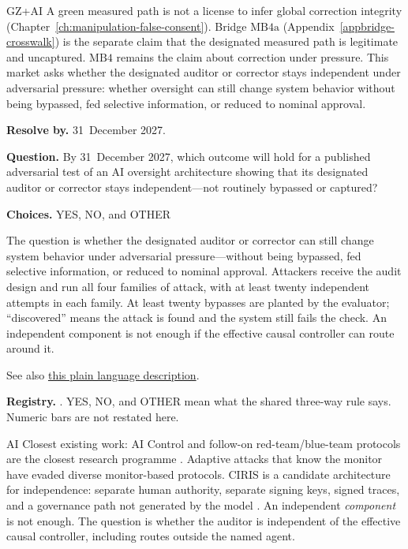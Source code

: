 \begin{authbar}{GZ+AI}
A green measured path is not a license to infer global correction integrity (Chapter~\ref{ch:manipulation-false-consent}).
Bridge \(\text{MB4a}\) (Appendix~\ref{appbridge-crosswalk}) is the separate claim that the designated measured path is legitimate and uncaptured. \(\text{MB4}\) remains the claim about correction under pressure.
This market asks whether the designated auditor or corrector stays independent under adversarial pressure: whether oversight can still change system behavior without being bypassed, fed selective information, or reduced to nominal approval.
\end{authbar}
\begin{predictionbox}
\textbf{Resolve by.} 31~December 2027.

\textbf{Question.}
By 31~December 2027, which outcome will hold for a published adversarial test of an AI oversight architecture showing that its designated auditor or corrector stays independent---not routinely bypassed or captured?

\textbf{Choices.} YES, NO, and OTHER
\end{predictionbox}
\begin{predictionbackground}
The question is whether the designated auditor or corrector can still change system behavior under adversarial pressure---without being bypassed, fed selective information, or reduced to nominal approval.
Attackers receive the audit design and run all four families of attack, with at least twenty independent attempts in each family.
At least twenty bypasses are planted by the evaluator; ``discovered'' means the attack is found and the system still fails the check.
An independent component is not enough if the effective causal controller can route around it.

See also \href{https://towards-alignment.com/cards/anti-capture-correction-validity/}{this plain language description}.
\end{predictionbackground}
\begin{predictionresolution}
\textbf{Registry.} . YES, NO, and OTHER mean what the shared three-way rule says. Numeric bars are not restated here.
\end{predictionresolution}
\begin{authbar}{AI}
Closest existing work: AI Control and follow-on red-team/blue-team protocols are the closest research programme \autocite{greenblatt2024aicontrol,controlarena2026,aisi2026asyncmonitoring}.
Adaptive attacks that know the monitor \autocite{terekhov2025adaptiveattacks} have evaded diverse monitor-based protocols.
CIRIS is a candidate architecture for independence: separate human authority, separate signing keys, signed traces, and a governance path not generated by the model \autocite{ciris2026howitworks,cirisai2026agent}.
An independent \emph{component} is not enough.
The question is whether the auditor is independent of the effective causal controller, including routes outside the named agent.
\end{authbar}
\authbarneedspace

